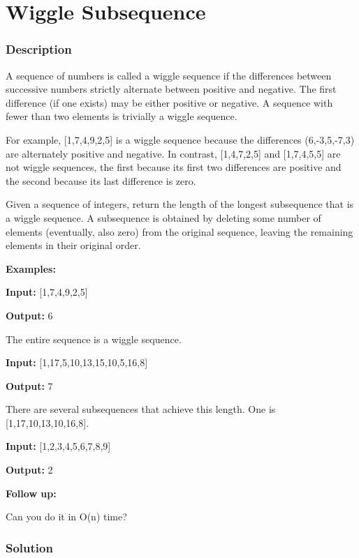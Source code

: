 \newpage

\section{Wiggle Subsequence} %

\subsubsection{Description}
A sequence of numbers is called a wiggle sequence if the differences between successive numbers strictly alternate between positive and negative. The first difference (if one exists) may be either positive or negative. A sequence with fewer than two elements is trivially a wiggle sequence.

For example, [1,7,4,9,2,5] is a wiggle sequence because the differences (6,-3,5,-7,3) are alternately positive and negative. In contrast, [1,4,7,2,5] and [1,7,4,5,5] are not wiggle sequences, the first because its first two differences are positive and the second because its last difference is zero.

Given a sequence of integers, return the length of the longest subsequence that is a wiggle sequence. A subsequence is obtained by deleting some number of elements (eventually, also zero) from the original sequence, leaving the remaining elements in their original order.

\textbf{Examples:}

\textbf{Input:} [1,7,4,9,2,5]

\textbf{Output:} 6

The entire sequence is a wiggle sequence.

\textbf{Input:} [1,17,5,10,13,15,10,5,16,8]

\textbf{Output:} 7

There are several subsequences that achieve this length. One is [1,17,10,13,10,16,8].

\textbf{Input:} [1,2,3,4,5,6,7,8,9]

\textbf{Output:} 2

\textbf{Follow up:}

Can you do it in O(n) time?

\subsubsection{Solution}

\begin{Code}

\end{Code}

